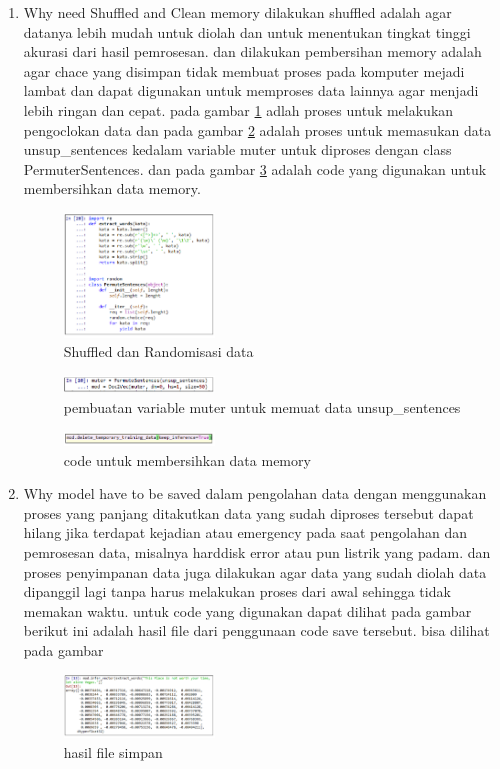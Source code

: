 \begin{enumerate}
\item Why need Shuffled and Clean memory
\subitem dilakukan shuffled adalah agar datanya lebih mudah untuk diolah dan untuk menentukan tingkat tinggi akurasi dari hasil pemrosesan. dan dilakukan pembersihan memory adalah agar chace yang disimpan tidak membuat proses pada komputer mejadi lambat dan dapat digunakan untuk memproses data lainnya agar menjadi lebih ringan dan cepat.
pada gambar \ref{l7} adlah proses untuk melakukan pengoclokan data dan pada gambar \ref{l8} adalah proses untuk memasukan data unsup\_sentences kedalam variable muter untuk diproses dengan class PermuterSentences. dan pada gambar \ref{l9} adalah code yang digunakan untuk membersihkan data memory.
\begin{figure}[H]
\includegraphics[width=4cm]{figures/1174002/chapter5/23.png}
\centering
\caption{Shuffled dan Randomisasi data }
\label{l7}
\end{figure}

\begin{figure}[H]
\includegraphics[width=4cm]{figures/1174002/chapter5/24.png}
\centering
\caption{pembuatan variable muter untuk memuat data unsup\_sentences}
\label{l8}
\end{figure}

\begin{figure}[H]
\includegraphics[width=4cm]{figures/1174002/chapter5/25.png}
\centering
\caption{code untuk membersihkan data memory}
\label{l9}
\end{figure}

\item Why model have to be saved
\subitem dalam pengolahan data dengan menggunakan proses yang panjang ditakutkan data yang sudah diproses tersebut dapat hilang jika terdapat kejadian atau emergency pada saat pengolahan dan pemrosesan data, misalnya harddisk error atau pun listrik yang padam. dan proses penyimpanan data juga dilakukan agar data yang sudah diolah data dipanggil lagi tanpa harus melakukan proses dari awal sehingga tidak memakan waktu. untuk code yang digunakan dapat dilihat pada gambar
berikut ini adalah hasil file dari penggunaan code save tersebut. bisa dilihat pada gambar
\begin{figure}[H]
\includegraphics[width=4cm]{figures/1174002/chapter5/28.png}
\centering
\caption{hasil file simpan}
\end{figure}


\end{enumerate}
